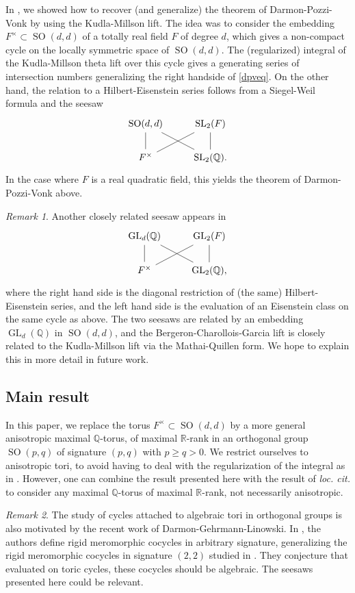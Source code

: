 \documentclass[11pt]{article} %
\newcommand{\8}{\infty}
\newcommand{\SO}{\operatorname{SO}}
\newcommand{\SL}{\operatorname{SL}}
\newcommand{\GL}{\operatorname{GL}}
\newcommand{\R}{\mathbb{R}}
\newcommand{\Q}{\mathbb{Q}}
\theoremstyle{mytheoremstyle}
\theoremstyle{remark}
\newtheorem{rmk}{Remark}[section]
\numberwithin{equation}{section}
\begin{document}
In \cite{rbrforum}, we showed how to recover (and generalize) the theorem of Darmon-Pozzi-Vonk by using the Kudla-Millson lift. The idea was to consider the embedding $F^\times \subset \SO(d,d)$ of a totally real field $F$ of degree $d$, which gives a non-compact cycle on the locally symmetric space of $\SO(d,d)$. The (regularized) integral of the Kudla-Millson theta lift over { this cycle} gives a generating series of intersection numbers generalizing the right handside of \eqref{dpveq}. On the other hand, the relation to a Hilbert-Eisenstein series follows from a Siegel-Weil formula and the seesaw
\[
\begin{tikzcd}
\SO(d,d) \arrow[dash, dr] & \SL_2(F) \\
F^\times \arrow[dash]{u} \arrow[dash, ru] & \SL_2(\Q). \arrow[dash]{u}
\end{tikzcd}
\]
In the case where $F$ is a real quadratic field, this { yields the theorem} of Darmon-Pozzi-Vonk above.
\begin{rmk} Another closely related seesaw appears in \cite{bcg}
    \[
\begin{tikzcd}
\GL_d(\Q) \arrow[dash, dr] & \GL_2(F) \\
F^\times \arrow[dash]{u} \arrow[dash, ru] & \GL_2(\Q), \arrow[dash]{u}
\end{tikzcd}
\]
where the right hand side is the diagonal restriction of (the same) Hilbert-Eisenstein series, and the left hand side is the evaluation of an Eisenstein class on the same cycle as above. The two seesaws are related by an embedding $\GL_d(\Q)$ in $\SO(d,d)$, and the Bergeron-Charollois-Garcia lift is closely related to the Kudla-Millson lift via the Mathai-Quillen form. We hope to explain this in more detail in future work. 
\end{rmk}
\subsection{Main result} In this paper, we replace the torus $F^\times \subset \SO(d,d)$ by a more general anisotropic maximal $\Q$-torus, of maximal $\R$-rank in an orthogonal group $\SO(p,q)$ of signature $(p,q)$ with $p \geq q >0$. We restrict ourselves to anisotropic tori, to avoid having to deal with the regularization of the integral as in \cite{rbrforum}. However, one can combine the result presented here with the result of {\em loc. cit.} to consider any maximal $\Q$-torus of maximal $\R$-rank, not necessarily anisotropic. 
\begin{rmk} The study of cycles attached to algebraic tori in orthogonal groups is also motivated by the recent work of Darmon-Gehrmann-Linowski. In \cite{dgl}, the authors define rigid meromorphic cocycles in arbitrary signature, generalizing the rigid meromorphic cocycles in signature $(2,2)$ studied in \cite{DPV}. They conjecture that evaluated on toric cycles, these cocycles should be algebraic. The seesaws presented here could be relevant.
\end{rmk}
\end{document}
